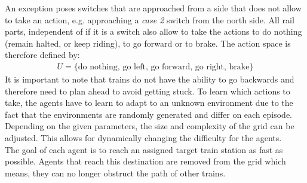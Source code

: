 An exception poses switches that are approached from a side that does not allow to take an action, e.g. approaching a \textit{case 2} switch from the north side.
All rail parts, independent of if it is a switch also allow to take the actions to do nothing (remain halted, or keep riding), to go forward or to brake.
The action space is therefore defined by:
\begin{gather*}
U = \{ \text{do nothing, go left, go forward, go right, brake} \}
\end{gather*}
It is important to note that trains do not have the ability to go backwards and therefore need to plan ahead to avoid getting stuck. To learn which actions to take, the agents have to learn to adapt to an unknown environment due to the fact that the environments are randomly generated and differ on each episode. Depending on the given parameters, the size and complexity of the grid can be adjusted. This allows for dynamically changing the difficulty for the agents.\\
The goal of each agent is to reach an assigned target train station as fast as possible. Agents that reach this destination are removed from the grid which means, they can no longer obstruct the path of other trains.

